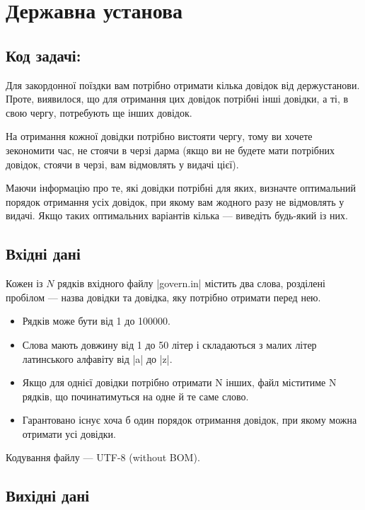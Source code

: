 \documentclass[12pt,a4paper]{article}
\begin{document}
\section*{Державна установа \hfill {}}


\subsection*{Код задачі: }

Для закордонної поїздки вам потрібно отримати кілька довідок від держустанови. Проте, виявилося, що для отримання цих довідок потрібні інші довідки, а ті, в свою чергу, потребують ще інших довідок.

На отримання кожної довідки потрібно вистояти чергу, тому ви хочете зекономити час, не стоячи в черзі дарма (якщо ви не будете мати потрібних довідок, стоячи в черзі, вам відмовлять у видачі цієї).

Маючи інформацію про те, які довідки потрібні для яких, визначте оптимальний порядок отримання усіх довідок, при якому вам жодного разу не відмовлять у видачі. Якщо таких оптимальних варіантів кілька --- виведіть будь-який із них.


\subsection*{Вхідні дані}

Кожен із \(N\) рядків вхідного файлу |govern.in| містить два слова, розділені пробілом --- назва довідки та довідка, яку потрібно отримати перед нею.

\begin{itemize}
    \item Рядків може бути від 1 до 100000.
    \item Слова мають довжину від 1 до 50 літер і складаються з малих літер латинського алфавіту від |a| до |z|.
    \item Якщо для однієї довідки потрібно отримати N інших, файл міститиме N рядків, що починатимуться на одне й те саме слово.
    \item Гарантовано існує хоча б один порядок отримання довідок, при якому можна отримати усі довідки.
\end{itemize}

Кодування файлу --- UTF-8 (without BOM).


\subsection*{Вихідні дані}
\end{document}
